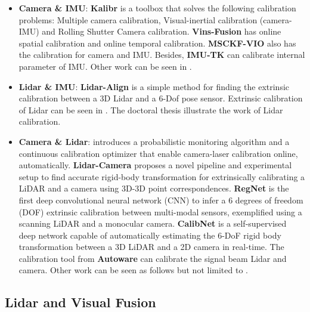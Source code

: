 \documentclass[journal,transmag]{IEEEtran}
\begin{document}
\begin{itemize}
    \item \textbf{Camera \& IMU}: \textbf{Kalibr} \cite{rehder2016extending} is a toolbox that solves the following calibration problems: Multiple camera calibration, Visual-inertial calibration (camera-IMU) and Rolling Shutter Camera calibration. \textbf{Vins-Fusion} \cite{qin2018online} has online spatial calibration  and online temporal calibration.  \textbf{MSCKF-VIO} \cite{sun2018robust} also has the calibration for camera and IMU. Besides, \textbf{IMU-TK} \cite{tpm_icra2014}\cite{pg_imeko2014} can calibrate internal parameter of IMU. Other work can be seen in \cite{li2014high}.
    \item \textbf{Lidar \& IMU}: \textbf{Lidar-Align} is a simple method for finding the extrinsic calibration between a 3D Lidar and a 6-Dof pose sensor. Extrinsic calibration of Lidar can be seen in \cite{yin2018extrinsic}\cite{chen2018extrinsic}. The doctoral thesis \cite{levinson2011automatic} illustrate the work of Lidar calibration. 
    \item \textbf{Camera \& Lidar}: \cite{levinson2013automatic} introduces a probabilistic monitoring algorithm and a continuous calibration optimizer that enable camera-laser calibration online, automatically. \textbf{Lidar-Camera} \cite{2017arXiv170509785D} proposes a novel pipeline and experimental setup to find accurate rigid-body transformation for extrinsically calibrating a LiDAR and a camera using 3D-3D point correspondences. \textbf{RegNet} \cite{schneider2017regnet} is the first deep convolutional neural network (CNN) to infer a 6 degrees of freedom (DOF) extrinsic calibration between multi-modal sensors, exemplified using a scanning LiDAR and a monocular camera. \textbf{CalibNet} \cite{iyer2018calibnet} is  a self-supervised deep network capable of automatically estimating the 6-DoF rigid body transformation between a 3D LiDAR and a 2D camera in real-time. The calibration tool from \textbf{Autoware} can calibrate the signal beam Lidar and camera. Other work can be seen as follows but not limited to \cite{mirzaei20123d}\cite{ishikawa2018lidar}.

\end{itemize}
\subsection{Lidar and Visual Fusion}
\end{document}
